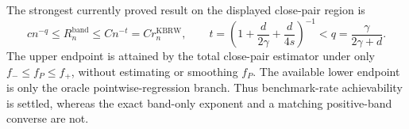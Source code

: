 The strongest currently proved result on the displayed close-pair region is
\[
c n^{-q}\leq R_n^{\mathrm{band}}\leq Cn^{-t}=Cr_n^{\mathrm{KBRW}},
\qquad
t=\left(1+\frac d{2\gamma}+\frac d{4s}\right)^{-1}
<q=\frac\gamma{2\gamma+d}.
\]
The upper endpoint is attained by the total close-pair estimator under only \(f_-\leq f_P\leq f_+\), without estimating or smoothing \(f_P\).  The available lower endpoint is only the oracle pointwise-regression branch.  Thus benchmark-rate achievability is settled, whereas the exact band-only exponent and a matching positive-band converse are not.